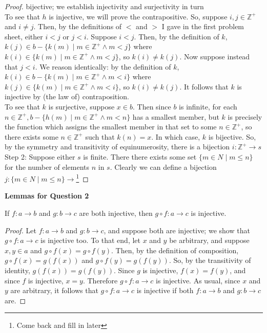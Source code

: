 \documentclass{article}
\begin{document}
\begin{proof}
bijective; we establish injectivity and surjectivity in turn\\ To see that $h$ is injective, we will prove the contrapositive. So, suppose $i,j \in \mathbb{Z^+}$ and $ i \neq j$. Then, by the definitions of $<$ and $>$ I gave in the first problem sheet, either $i < j$ or $j < i$. Suppose $i < j$. Then, by the definition of $k$, $k(j) \in b - \{k(m) \mid m \in \mathbb{Z^+} \wedge m < j\}$ where $k(i) \in \{k(m) \mid m \in \mathbb{Z^+} \wedge m < j\}$, so $k(i) \neq k(j)$. Now suppose instead that $j < i$. We reason identically: by the definition of $k$, $k(i) \in b - \{k(m) \mid m \in \mathbb{Z^+} \wedge m < i\}$ where $k(j) \in \{k(m) \mid m \in \mathbb{Z^+} \wedge m < i\}$, so $k(i) \neq k(j)$. It follows that $k$ is injective by (the law of) contraposition. \\ To see that $k$ is surjective, suppose $x \in b$. Then since $b$ is infinite, for each $n \in \mathbb{Z^+}, b - \{ h(m) \mid m \in \mathbb{Z^+} \wedge m < n \}$ has a smallest member, but $k$ is precisely the function which assigns the smallest member in that set to some $n \in \mathbb{Z^+}$, so there exists some $n \in \mathbb{Z^+}$ such that $k(n) = x$. In which case, $k$ is bijective. So, by the symmetry and transitivity of equinumerosity, there is a bijection $i: \mathbb{Z^+} \rightarrow s$\\ Step 2: \hspace{0.1cm} Suppose either $s$ is finite. There there exists some set $\{m \in N \mid m \leq n \}$ for the number of elements $n$ in $s$. Clearly we can define a bijection $j: \{m \in N \mid m \leq n \}\rightarrow$\footnote[1]{Come back and fill in later} 
\end{proof}

\begin{center} \textbf{Lemmas for Question 2} \end{center}

\begin{lemma} If $f : a \rightarrow b$ and $g : b \rightarrow c$ are both injective, then $g \circ f : a \rightarrow c$ is injective. \end{lemma}
\begin{proof} Let $f : a \rightarrow b$ and $g : b \rightarrow c$, and suppose both are injective; we show that $g \circ f : a \rightarrow c$ is injective too.  To that end, let $x$ and $y$ be arbitrary, and suppose $x,y \in a$ and $g \circ f(x) = g \circ f(y)$. Then, by the definition of composition, $ g \circ f(x) = g(f(x))$ and $g \circ f(y) = g(f(y))$. So, by the transitivity of identity, $g(f(x)) = g(f(y))$. Since $g$ is injective, $f(x) = f(y)$, and since $f$ is injective, $x = y$. Therefore $g \circ f : a \rightarrow c$ is injective. As usual, since $x$ and $y$ are arbitrary, it follows that $g \circ f : a \rightarrow c$ is injective if both $f : a \rightarrow b$ and $g : b \rightarrow c$ are. \end{proof}
\end{document}

